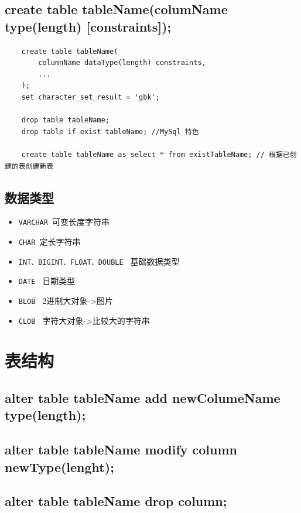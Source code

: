 \documentclass[UTF8,a4paper,12pt]{ctexbook}
\begin{document}
		\subsection{create table tableName(columName type(length) [constraints]);}
			\begin{lstlisting}
	create table tableName(
		columnName dataType(length) constraints,
		...
	);
	set character_set_result = 'gbk';
	
	drop table tableName;
	drop table if exist tableName; //MySql 特色
	
	create table tableName as select * from existTableName; // 根据已创建的表创建新表
			\end{lstlisting}
		
		\subsection{数据类型}
			\begin{itemize}
				\item \verb|VARCHAR |可变长度字符串
				\item \verb|CHAR |定长字符串
				\item \verb|INT、BIGINT、FLOAT、DOUBLE | 基础数据类型
				\item \verb|DATE | 日期类型
				\item \verb|BLOB | 2进制大对象->图片
				\item \verb|CLOB | 字符大对象->比较大的字符串
			\end{itemize}
			
	\section{表结构}	
		\subsection{alter table tableName add newColumeName type(length);}
		
		\subsection{alter table tableName modify column newType(lenght);}
		
		\subsection{alter table tableName drop column;}
	
	
		
\end{document}
